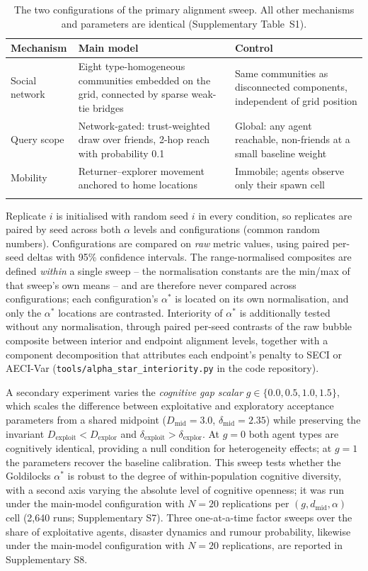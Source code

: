 \documentclass[pdflatex,sn-nature]{sn-jnl}
\begin{document}
\begin{table}[h]
\caption{The two configurations of the primary alignment sweep. All other mechanisms and parameters are identical (Supplementary Table~S1).}\label{tab:configs}
\begin{tabular}{@{}p{3.2cm}p{4.6cm}p{4.6cm}@{}}
\toprule
Mechanism & Main model & Control \\
\midrule
Social network & Eight type-homogeneous communities embedded on the grid, connected by sparse weak-tie bridges & Same communities as disconnected components, independent of grid position \\
Query scope & Network-gated: trust-weighted draw over friends, 2-hop reach with probability 0.1 & Global: any agent reachable, non-friends at a small baseline weight \\
Mobility & Returner--explorer movement anchored to home locations \citep{pappalardo2015returners} & Immobile; agents observe only their spawn cell \\
\botrule
\end{tabular}
\end{table} Replicate $i$ is initialised with random seed $i$ in every condition, so replicates are paired by seed across both $\alpha$ levels and configurations (common random numbers). Configurations are compared on \emph{raw} metric values, using paired per-seed deltas with 95\% confidence intervals. The range-normalised composites are defined \emph{within} a single sweep -- the normalisation constants are the min/max of that sweep's own means -- and are therefore never compared across configurations; each configuration's $\alpha^{*}$ is located on its own normalisation, and only the $\alpha^{*}$ locations are contrasted. Interiority of $\alpha^{*}$ is additionally tested without any normalisation, through paired per-seed contrasts of the raw bubble composite between interior and endpoint alignment levels, together with a component decomposition that attributes each endpoint's penalty to SECI or AECI-Var (\texttt{tools/alpha\_star\_interiority.py} in the code repository).

A secondary experiment varies the \emph{cognitive gap scalar} $g \in \{0.0, 0.5, 1.0, 1.5\}$, which scales the difference between exploitative and exploratory acceptance parameters from a shared midpoint ($D_{\text{mid}} = 3.0$, $\delta_{\text{mid}} = 2.35$) while preserving the invariant $D_{\text{exploit}} < D_{\text{explor}}$ and $\delta_{\text{exploit}} > \delta_{\text{explor}}$. At $g = 0$ both agent types are cognitively identical, providing a null condition for heterogeneity effects; at $g = 1$ the parameters recover the baseline calibration. This sweep tests whether the Goldilocks $\alpha^{*}$ is robust to the degree of within-population cognitive diversity, with a second axis varying the absolute level of cognitive openness; it was run under the main-model configuration with $N = 20$ replications per $(g, d_{\text{mid}}, \alpha)$ cell (2{,}640 runs; Supplementary S7). Three one-at-a-time factor sweeps over the share of exploitative agents, disaster dynamics and rumour probability, likewise under the main-model configuration with $N = 20$ replications, are reported in Supplementary S8.
\end{document}
